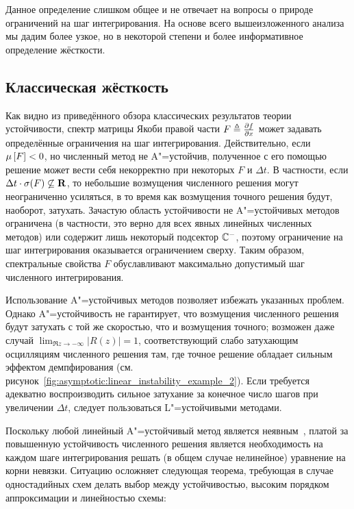 Данное определение слишком общее и не отвечает на вопросы о природе ограничений на шаг интегрирования.
На основе всего вышеизложенного анализа мы дадим более узкое,
но в некоторой степени и более информативное определение жёсткости.


\subsection{Классическая жёсткость}
\label{subsection:stiffness:classical_stiffness}

Как видно из приведённого обзора классических результатов теории устойчивости,
спектр матрицы Якоби правой части $ F \triangleq \frac{\partial f}{\partial x} $
может задавать определённые ограничения на шаг интегрирования.
Действительно, если $ \mu \left[ F \right] < 0 $, но численный метод не A"=устойчив,
полученное с его помощью решение может вести себя некорректно при некоторых $ F $ и $ \Delta t $.
В частности, если $ \Delta t \cdot \sigma(F) \not\subseteq \mathbf{R} $,
то небольшие возмущения численного решения могут неограниченно усиляться,
в то время как возмущения точного решения будут, наоборот, затухать.
Зачастую область устойчивости не A"=устойчивых методов ограничена
(в частности, это верно для всех явных линейных численных методов)
или содержит лишь некоторый подсектор $ \mathbb{C}^- $,
поэтому ограничение на шаг интегрирования оказывается ограничением сверху.
Таким образом, спектральные свойства $ F $ обуславливают максимально допустимый шаг численного интегрирования.

Использование A"=устойчивых методов позволяет избежать указанных проблем.
Однако A"=устойчивость не гарантирует, что возмущения численного решения будут затухать с той же скоростью,
что и возмущения точного;
возможен даже случай $ \displaystyle \lim_{\Re z \to -\infty} |R(z)| = 1 $,
соответствующий слабо затухающим осцилляциям численного решения там,
где точное решение обладает сильным эффектом демпфирования
(см. рисунок~\ref{fig:asymptotic:linear_instability_example_2}).
Если требуется адекватно воспроизводить сильное затухание за конечное число шагов при увеличении $ \Delta t $,
следует пользоваться L"=устойчивыми методами.

Поскольку любой линейный A"=устойчивый метод является неявным~\cite{lambert1991methods},
платой за повышенную устойчивость численного решения
является необходимость на каждом шаге интегрирования решать (в общем случае нелинейное) уравнение на корни невязки.
Ситуацию осложняет следующая теорема,
требующая в случае одностадийных схем делать выбор между устойчивостью, высоким порядком аппроксимации и линейностью схемы:


